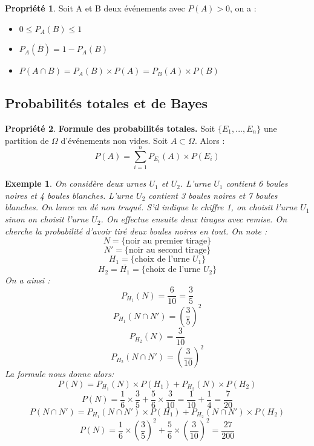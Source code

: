 \documentclass[a4paper,12pt,final]{article}
\newtheorem{Ex}{Exemple}[section]
\theoremstyle{theorem}
\theoremstyle{definition}
\newtheorem{Propriete}{Propriété}[section]
\theoremstyle{definition}
\theoremstyle{definition}
\begin{document}
		\begin{Propriete}
			Soit A et B deux événements avec $P(A)>0$, on a : \\
			\begin{itemize}
				\item $0 \leq P_{A}(B) \leq 1$
				\item $P_{A}(\bar{B}) = 1-P_{A}(B)$
				\item $P(A\cap B) = P_{A}(B) \times P(A) = P_{B}(A) \times P(B)$
			\end{itemize}
		\end{Propriete}
	
	\subsection{Probabilités totales et de Bayes}
		\begin{Propriete}
			\textbf{Formule des probabilités totales.} Soit $\{E_{1},...,E_{n}\}$ une partition de $\Omega$ d'événements non vides. Soit $A\subset \Omega$. Alors :
			\[P(A) = \sum_{i=1}^{n} P_{E_{i}}(A) \times P(E_{i})\]
		\end{Propriete}
		
		\begin{Ex}
			On considère deux urnes $U_{1}$ et $U_{2}$. L'urne $U_{1}$ contient 6 boules noires et 4 boules blanches. L'urne $U_{2}$ contient 3 boules noires et 7 boules blanches. On lance un dé non truqué. S'il indique le chiffre 1, on choisit l'urne $U_{1}$ sinon on choisit l'urne $U_{2}$. On effectue ensuite deux tirages avec remise. On cherche la probabilité d'avoir tiré deux boules noires en tout. On note :
			\[N = \{\text{noir au premier tirage}\}\]
			\[N' = \{\text{noir au second tirage}\}\]
			\[H_{1} = \{\text{choix de l'urne $U_{1}$}\}\]
			\[H_{2} = \bar{H_{1}} = \{\text{choix de l'urne $U_{2}$}\}\]
			On a ainsi :
			\[P_{H_{1}}(N) = \frac{6}{10} = \frac{3}{5}\]
			\[P_{H_{1}}(N\cap N') = (\frac{3}{5})^{2}\]
			\[P_{H_{2}}(N) = \frac{3}{10}\]
			\[P_{H_{2}}(N\cap N') = (\frac{3}{10})^{2}\]
			La formule nous donne alors:
			\[P(N) = P_{H_{1}}(N) \times P(H_{1}) + P_{H_{2}}(N) \times P(H_{2})\]
			\[P(N) = \frac{1}{6} \times \frac{3}{5} + \frac{5}{6} \times \frac{3}{10} = \frac{1}{10} + \frac{1}{4} = \frac{7}{20}\]
			\[P(N\cap N') = P_{H_{1}}(N\cap N') \times P(H_{1}) + P_{H_{2}}(N\cap N') \times P(H_{2})\]
			\[P(N) = \frac{1}{6} \times (\frac{3}{5})^{2} + \frac{5}{6} \times (\frac{3}{10})^{2} = \frac{27}{200}\]
			
		\end{Ex}
	
\end{document}
